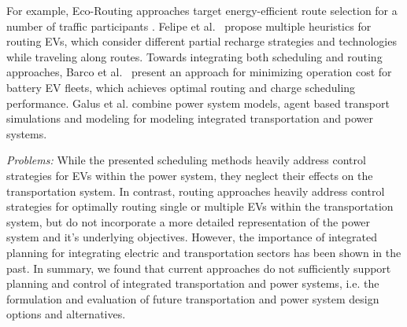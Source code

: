 For example, Eco-Routing approaches target energy-efficient route selection for a number of traffic participants \cite{ericsson2006optimizing}. 
Felipe et al.~\cite{felipe2014heuristic} propose multiple heuristics for routing EVs, which consider different partial recharge strategies and technologies while traveling along routes. 
Towards integrating both scheduling and routing approaches, Barco et al.~\cite{barco2013optimal} present an approach for minimizing operation cost for battery EV fleets, which achieves optimal routing and charge scheduling performance. Galus et al. \cite{galus2012integrating} combine power system models, agent based transport simulations and modeling for modeling integrated transportation and power systems.



\textit{Problems:} While the presented scheduling methods heavily address control strategies for EVs within the power system, they neglect their effects on the transportation system. In contrast, routing approaches heavily address control strategies for optimally routing single or multiple EVs within the transportation system, but do not incorporate a more detailed representation of the power system and it's underlying objectives. However, the importance of integrated planning for integrating electric and transportation sectors \cite{mathiesen2008integrated} has been shown in the past. In summary, we found that current approaches do not sufficiently support planning and control of integrated transportation and power systems, i.e. the formulation and evaluation of future transportation and power system design options and alternatives.


